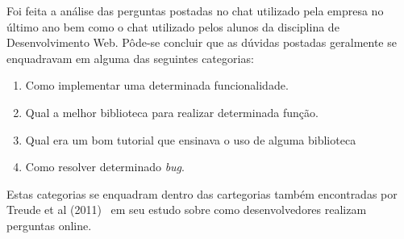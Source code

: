 Foi feita a análise das perguntas postadas no chat utilizado pela empresa no último ano bem como o chat utilizado pelos alunos da disciplina de Desenvolvimento Web. Pôde-se concluir que as dúvidas postadas geralmente se enquadravam em alguma das seguintes categorias:

\begin{enumerate}
  \item Como implementar uma determinada funcionalidade.
  \item Qual a melhor biblioteca para realizar determinada função.
  \item Qual era um bom tutorial que ensinava o uso de alguma biblioteca
  \item Como resolver determinado \textit{bug}.
\end{enumerate}

Estas categorias se enquadram dentro das cartegorias também encontradas por Treude et al (2011)~\cite{Treude2011} em seu estudo sobre como desenvolvedores realizam perguntas online.











